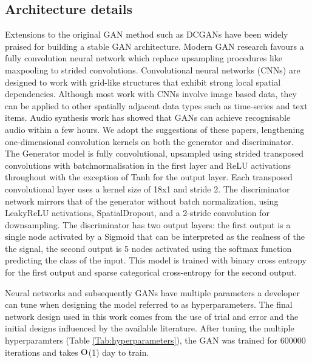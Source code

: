 \documentclass[12pt]{iopart}
\begin{document}
\subsection{Architecture details}
Extensions to the original GAN method such as  DCGANs \cite{Radford2015} have been widely praised for building a stable GAN architecture. Modern GAN research favours a fully convolution neural network which replace upsampling procedures like maxpooling to strided convolutions. Convolutional neural networks (CNNs) are designed to work with grid-like structures that exhibit strong local spatial dependencies.  Although most work with CNNs involve image based data, they can be applied to other spatially adjacent data types such as time-series and text items. Audio synthesis work \cite{DBLP:journals/corr/abs-1809-11096} has showed that GANs can achieve recognisable audio within a few hours. We adopt the suggestions of these papers, lengthening one-dimensional convolution kernels on both the generator and discriminator. The Generator model is fully convolutional, upsampled using strided transposed convolutions with batchnormalisation in the first layer and ReLU activations throughout with the exception of Tanh for the output layer. Each transposed convolutional layer uses a kernel size of 18x1 and stride 2. The discriminator network mirrors that of the generator without batch normalization, using LeakyReLU activations, SpatialDropout, and a 2-stride convolution for downsampling. The discriminator has two output layers: the first output is a single node activated by a Sigmoid that can be interpreted as the realness of the the signal, the second output is 5 nodes activated using the softmax function predicting the class of the input. This model is trained with binary cross entropy for the first output and sparse categorical cross-entropy for the second output.

Neural networks and subsequently GANs have multiple parameters a developer can tune when designing the model referred to as hyperparameters. The final network design used in this work comes from the use of trial and error and the initial designs influenced by the available literature. After tuning the multiple hyperparamters (Table \ref{Tab:hyperparameters}), the GAN was trained for 600000 iterations and takes $\mathord{\mathrm{O}}$(1) day to train.
\end{document}
